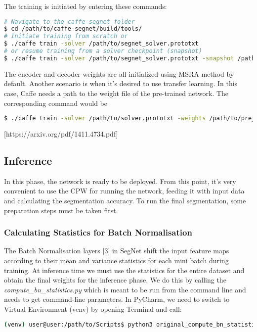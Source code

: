 \noindent The training is initiated by entering these commands:

\begin{lstlisting}[language=bash]
# Navigate to the caffe-segnet folder
$ cd /path/to/caffe-segnet/build/tools/
# Initiate training from scratch or
$ ./caffe train -solver /path/to/segnet_solver.prototxt
# or resume training from a solver checkpoint (snapshot)
$ ./caffe train -solver /path/to/segnet_solver.prototxt -snapshot /path/to/snapshot_iter_XY.solverstate
\end{lstlisting}

The encoder and decoder weights are all initialized using MSRA method by default. Another scenario is when it's desired to use transfer learning. In this case, Caffe needs a path to the weight file of the pre-trained network. The corresponding command would be

\begin{lstlisting}[language=bash]
$ ./caffe train -solver /path/to/solver.prototxt -weights /path/to/pre_trained_weights.caffemodel
\end{lstlisting}

 [https://arxiv.org/pdf/1411.4734.pdf]

\subsection{Inference}

In this phase, the network is ready to be deployed. From this point, it's very convenient to use the CPW for running the network, feeding it with input data and calculating the segmentation accuracy. To run the final segmentation, some preparation steps must be taken first.

\subsubsection{Calculating Statistics for Batch Normalisation}
The Batch Normalisation layers [3] in SegNet shift the input feature maps according to their mean and variance statistics for each mini batch during training. At inference time we must use the statistics for the entire dataset and obtain the final weights for the inference phase. We do this by calling the \textit{compute\_bn\_statistics.py} which is meant to be run from the command line and needs to get command-line parameters. In PyCharm, we need to switch to Virtual Environment (venv) by opening Terminal and call:

\begin{lstlisting}[language=bash]
(venv) user@user:/path/to/Scripts$ python3 original_compute_bn_statistics.py /path/to/train.prototxt /path/to/snap_iter_XY.caffemodel /path/to/inference_folder
\end{lstlisting}

